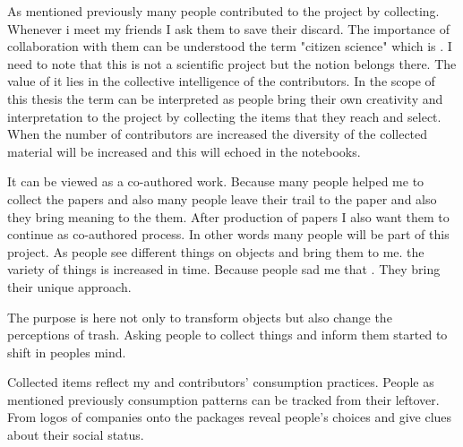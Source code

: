 As mentioned previously many people contributed to the project by collecting. Whenever i meet my friends I ask them to save their discard. The importance of collaboration with them can be understood the term "citizen science" which is  \citep{robson2012using}. I need to note that this is not a scientific project but the notion belongs there. The value of it lies in the collective intelligence of the contributors. In the scope of this thesis the term can be interpreted as people bring their own creativity and interpretation to the project by collecting the items that they reach and select. When the number of contributors are increased the diversity of the collected material will be increased and this will echoed in the notebooks. 

It can be viewed as a co-authored work. Because many people helped me to collect the papers and also many people leave their trail to the paper and also they bring meaning to the them. After production of papers I also want them to continue as co-authored process. In other words many people will be part of this project. As people see different things on objects and bring them to me. the variety of things is increased in time. Because people sad me that . They bring their unique approach. 



The purpose is here not only to transform objects but also change the perceptions of trash. Asking people to collect things and inform them started to shift in peoples mind.

Collected items reflect my and contributors' consumption practices. People as mentioned previously consumption patterns can be tracked from their leftover. From logos of companies onto the packages reveal people's choices and give clues about their social status.

